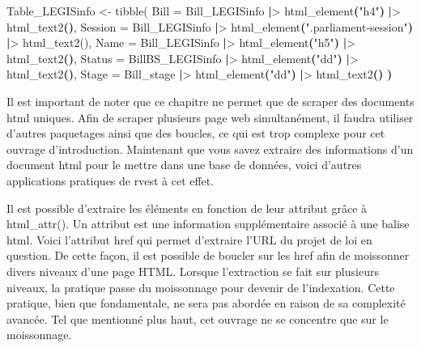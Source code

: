 \documentclass[
  letterpaper,
  DIV=11,
  numbers=noendperiod]{scrreprt}
\newenvironment{Shaded}{\begin{snugshade}}{\end{snugshade}}
\newcommand{\ErrorTok}[1]{\textcolor[rgb]{0.68,0.00,0.00}{#1}}
\newcommand{\ExtensionTok}[1]{\textcolor[rgb]{0.00,0.23,0.31}{#1}}
\newcommand{\FunctionTok}[1]{\textcolor[rgb]{0.28,0.35,0.67}{#1}}
\newcommand{\KeywordTok}[1]{\textcolor[rgb]{0.00,0.23,0.31}{\textbf{#1}}}
\newcommand{\NormalTok}[1]{\textcolor[rgb]{0.00,0.23,0.31}{#1}}
\newcommand{\OperatorTok}[1]{\textcolor[rgb]{0.37,0.37,0.37}{#1}}
\newcommand{\StringTok}[1]{\textcolor[rgb]{0.13,0.47,0.30}{#1}}
\begin{document}
\begin{Shaded}
\begin{Highlighting}[]
\ExtensionTok{Table\_LEGISinfo} \OperatorTok{\textless{}}\NormalTok{{-} tibble}\ErrorTok{(}
  \ExtensionTok{Bill}\NormalTok{ = Bill\_LEGISinfo }\KeywordTok{|}\OperatorTok{\textgreater{}}\NormalTok{ html\_element}\KeywordTok{(}\StringTok{"h4"}\KeywordTok{)} \KeywordTok{|}\OperatorTok{\textgreater{}}\NormalTok{ html\_text2}\KeywordTok{()}\ExtensionTok{,}
  \ExtensionTok{Session}\NormalTok{ = Bill\_LEGISinfo }\KeywordTok{|}\OperatorTok{\textgreater{}}\NormalTok{ html\_element}\KeywordTok{(}\StringTok{".parliament{-}session"}\KeywordTok{)} \KeywordTok{|}\OperatorTok{\textgreater{}}
  \FunctionTok{html\_text2()}\ExtensionTok{,}
  \ExtensionTok{Name}\NormalTok{ = Bill\_LEGISinfo }\KeywordTok{|}\OperatorTok{\textgreater{}}\NormalTok{ html\_element}\KeywordTok{(}\StringTok{"h5"}\KeywordTok{)} \KeywordTok{|}\OperatorTok{\textgreater{}}\NormalTok{ html\_text2}\KeywordTok{()}\ExtensionTok{,}
  \ExtensionTok{Status}\NormalTok{ = BillBS\_LEGISinfo }\KeywordTok{|}\OperatorTok{\textgreater{}}\NormalTok{ html\_element}\KeywordTok{(}\StringTok{"dd"}\KeywordTok{)} \KeywordTok{|}\OperatorTok{\textgreater{}}\NormalTok{ html\_text2}\KeywordTok{()}\ExtensionTok{,}
  \ExtensionTok{Stage}\NormalTok{ = Bill\_stage }\KeywordTok{|}\OperatorTok{\textgreater{}}\NormalTok{ html\_element}\KeywordTok{(}\StringTok{"dd"}\KeywordTok{)} \KeywordTok{|}\OperatorTok{\textgreater{}}\NormalTok{ html\_text2}\KeywordTok{()}
\KeywordTok{)}
\end{Highlighting}
\end{Shaded}

Il est important de noter que ce chapitre ne permet que de scraper des
documents html uniques. Afin de scraper plusieurs page web
simultanément, il faudra utiliser d'autres paquetages ainsi que des
boucles, ce qui est trop complexe pour cet ouvrage d'introduction.
Maintenant que vous savez extraire des informations d'un document html
pour le mettre dans une base de données, voici d'autres applications
pratiques de rvest à cet effet.

Il est possible d'extraire les éléments en fonction de leur attribut
grâce à html\_attr(). Un attribut est une information supplémentaire
associé à une balise html. Voici l'attribut href qui permet d'extraire
l'URL du projet de loi en question. De cette façon, il est possible de
boucler sur les href afin de moissonner divers niveaux d'une page HTML.
Lorsque l'extraction se fait sur plusieurs niveaux, la pratique passe du
moissonnage pour devenir de l'indexation. Cette pratique, bien que
fondamentale, ne sera pas abordée en raison de sa complexité avancée.
Tel que mentionné plus haut, cet ouvrage ne se concentre que sur le
moissonnage.
\end{document}
